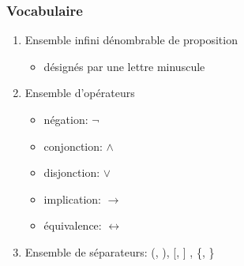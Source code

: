 \documentclass[10pt,a4paper]{article}
\begin{document}
	\subsubsection{Vocabulaire}
		\begin{enumerate}
			\item Ensemble infini dénombrable de proposition
			\begin{itemize}
				\item désignés par une lettre minuscule
			\end{itemize}
			\item Ensemble d'opérateurs
			\begin{itemize}
				\item négation: $\neg$
				\item conjonction: $\wedge$
				\item disjonction: $\vee$
				\item implication: $\rightarrow$
				\item équivalence: $\leftrightarrow$
			\end{itemize}
			\item Ensemble de séparateurs: (, ), [, ] , \{, \}
		\end{enumerate}
\end{document}
